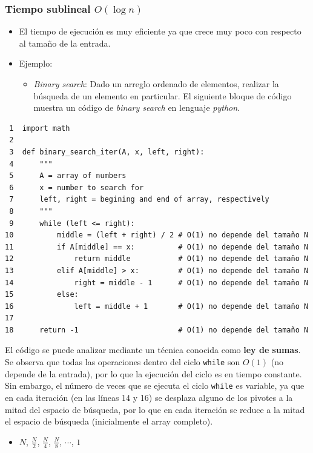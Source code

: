 \documentclass[letterpaper, 12pt]{article}
\begin{document}
\subsubsection{Tiempo sublineal \(O(\log n)\)}
\label{sec:org967429f}
\begin{itemize}
\item El tiempo de ejecución es muy eficiente ya que crece muy poco con respecto al
tamaño de la entrada.
\item Ejemplo:
\begin{itemize}
\item \emph{Binary search}: Dado un arreglo ordenado de elementos, realizar la búsqueda
de un elemento en particular. El siguiente bloque de código muestra un
código de \emph{binary search} en lenguaje \emph{python}.
\end{itemize}
\end{itemize}
\begin{verbatim}
 1  import math
 2  
 3  def binary_search_iter(A, x, left, right):
 4      """
 5      A = array of numbers
 6      x = number to search for
 7      left, right = begining and end of array, respectively
 8      """
 9      while (left <= right):
10          middle = (left + right) / 2 # O(1) no depende del tamaño N
11          if A[middle] == x:          # O(1) no depende del tamaño N
12              return middle           # O(1) no depende del tamaño N
13          elif A[middle] > x:         # O(1) no depende del tamaño N
14              right = middle - 1      # O(1) no depende del tamaño N
15          else:
16              left = middle + 1       # O(1) no depende del tamaño N
17  
18      return -1                       # O(1) no depende del tamaño N
\end{verbatim}

El código se puede analizar mediante un técnica conocida como \textbf{ley de sumas}. Se
observa que todas las operaciones dentro del ciclo \texttt{while} son \(O(1)\) (no
depende de la entrada), por lo que la ejecución del ciclo es en tiempo
constante. Sin embargo, el número de veces que se ejecuta el ciclo \texttt{while} es
variable, ya que en cada iteración (en las líneas 14 y 16) se desplaza alguno de
los pivotes a la mitad del espacio de búsqueda, por lo que en cada iteración
se reduce a la mitad el espacio de búsqueda (inicialmente el array completo).
\begin{itemize}
\item \(N\), \(\frac{N}{2}\), \(\frac{N}{4}\), \(\frac{N}{8}\), \(\cdots\), \(1\)
\end{itemize}
\end{document}
